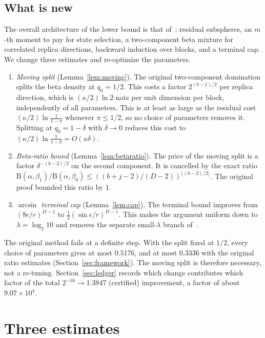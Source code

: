 \documentclass[11pt]{article}
\theoremstyle{definition}
\theoremstyle{remark}
\newcommand{\B}{\mathrm B}
\begin{document}
\subsection{What is new}
The overall architecture of the lower bound is that of~\cite{OAIsub}:
residual subspheres, an \(m\)-th moment to pay for state selection,
a two-component beta mixture for correlated replica directions,
backward induction over blocks, and a terminal cap. We change three
estimates and re-optimize the parameters.
\begin{enumerate}[label=(\roman*)]
\item \emph{Moving split} (Lemma~\ref{lem:moving}). The original
two-component domination splits the beta density at \(q_0=1/2\). This
costs a factor \(2^{(b-1)/2}\) per replica direction, which is \((\kappa/2)\ln2\)
nats per unit dimension per block, independently of all parameters. This is at least as large as the
residual cost \((\kappa/2)\ln\frac1{1-\pi}\) whenever \(\pi\le1/2\), so no choice of parameters removes it. Splitting at \(q_0=1-\delta\)
with \(\delta\to0\) reduces this cost to \((\kappa/2)\ln\frac1{1-\delta}=O(\kappa\delta)\).
\item \emph{Beta-ratio bound} (Lemma~\ref{lem:betaratio}). The price of
the moving split is a factor \(\delta^{-(b-2)/2}\) on the second
component. It is cancelled by the exact ratio
\(\B(\alpha,\beta_1)/\B(\alpha,\beta_0)\le((b+j-2)/(D-2))^{\lfloor(b-2)/2\rfloor}\).
The original proof bounded this ratio by \(1\).
\item \emph{\(\arcsin\) terminal cap} (Lemma~\ref{lem:cap}). The terminal bound
improves from \((8\epsilon/r)^{D-1}\) to \(\frac12(\sin\epsilon/r)^{D-1}\). This makes the
argument uniform down to \(\lambda=\log_2 10\) and removes the separate
small-\(\lambda\) branch of~\cite{OAIsub}.
\end{enumerate}
The original method fails at a definite step. With the split fixed at
\(1/2\), every choice of parameters gives at most
\(0.5176\), and at most \(0.3336\) with the original ratio estimates
(Section~\ref{sec:framework}). The moving split is therefore necessary,
not a re-tuning. Section~\ref{sec:ledger} records which change
contributes which factor of the total \(2^{-16}\to1.3847\)
(certified) improvement, a factor of about \(9.07\times10^4\).

\section{Three estimates}\label{sec:lemmas}
\end{document}
